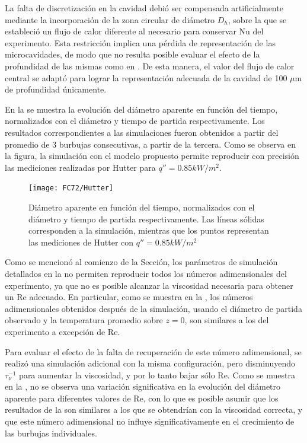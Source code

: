 La falta de discretizaci\'on en la cavidad debi\'o ser compensada artificialmente  mediante la incorporaci\'on de la zona circular de di\'ametro $D_h$, sobre la que se estableci\'o un flujo de calor diferente al necesario para conservar Nu del experimento. Esta restricci\'on implica una p\'erdida de representaci\'on de las microcavidades, de modo que no resulta posible evaluar el efecto de la profundidad de las mismas como en \cite{hutter_experimental_2009, hutter_experimental_2010}. De esta manera, el valor del flujo de calor central se adapt\'o para lograr la representaci\'on adecuada de la cavidad de 100 $\mu$m de profundidad \'unicamente.

En la  se muestra la evoluci\'on del di\'ametro aparente en funci\'on del tiempo, normalizados con el di\'ametro y tiempo de partida respectivamente. Los resultados correspondientes a las simulaciones fueron obtenidos a partir del promedio de 3 burbujas consecutivas, a partir de la tercera. Como se observa en la figura, la simulaci\'on con el modelo propuesto permite reproducir con precisi\'on las mediciones realizadas por Hutter para $q'' = 0.85kW/m^2$.


\begin{figure}[ht]
	\centering
	\texttt{[image: FC72/Hutter]}
	\caption{Di\'ametro aparente en funci\'on del tiempo, normalizados con el di\'ametro y tiempo de partida respectivamente. Las l\'ineas s\'olidas corresponden a la simulaci\'on, mientras que los puntos representan las mediciones de Hutter con $q'' = 0.85kW/m^2$}
	\label{fig:d_vs_t}
\end{figure}

Como se mencion\'o al comienzo de la Secci\'on, los par\'ametros de simulaci\'on detallados en la  no permiten reproducir todos los n\'umeros adimensionales del experimento, ya que no es posible alcanzar la viscosidad necesaria para obtener un Re adecuado. En particular, como se muestra en la , los n\'umeros adimensionales obtenidos despu\'es de la simulaci\'on, usando el di\'ametro de partida observado y la temperatura promedio sobre $z=0$, son similares a los del experimento a excepci\'on de Re. 

Para evaluar el efecto de la falta de recuperaci\'on de este n\'umero adimensional, se realiz\'o una simulaci\'on adicional con la misma configuraci\'on, pero disminuyendo $\tau_{\nu}^{-1}$ para aumentar la viscosidad, y por lo tanto bajar s\'olo Re. Como se muestra en la , no se observa una variaci\'on significativa en la evoluci\'on del di\'ametro aparente para diferentes valores de Re, con lo que es posible asumir que los resultados de la  son similares a los que se obtendr\'ian con la viscosidad correcta, y que este n\'umero adimensional no influye significativamente en el crecimiento de las burbujas individuales.

